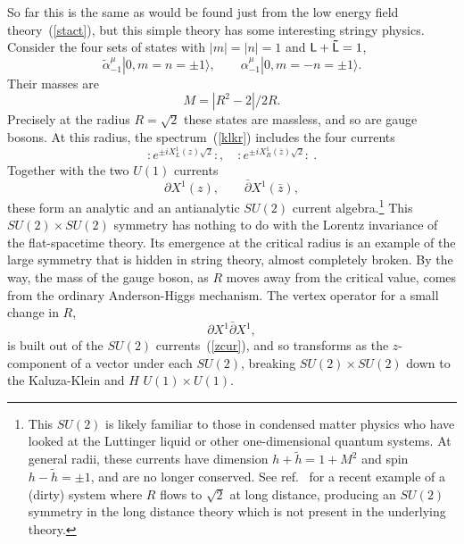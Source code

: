 So far this is the same as would be found just from the low energy
field theory~(\ref{stact}), but this simple theory has some
interesting stringy physics.  Consider the four sets of states with
$|m|= |n| = 1$ and ${\sf L} + {\sf \tilde L} = 1$,
\begin{equation}
\tilde\alpha_{-1}^\mu | 0, m=n= \pm 1 \rangle, \qquad
\alpha_{-1}^\mu | 0, m=-n= \pm 1 \rangle.
\end{equation}
Their masses are
\begin{equation}
M = |R^2 - 2|/2R.
\end{equation}
Precisely at the radius $R = \sqrt{2}$ these states are massless,
and so are gauge bosons.  At this radius, the spectrum~(\ref{klkr})
includes the four currents
\begin{equation}
:\! e^{\pm i X^{1}_L(z) \sqrt{2} }\! :, \quad
:\! e^{\pm i X^{1}_R(\bar z) \sqrt{2} }\! :\ .
\end{equation}
Together with the two $U(1)$ currents
\begin{equation}
\partial X^{1}(z), \qquad \bar\partial X^{1}(\bar z), \label{zcur}
\end{equation}
these form an analytic and an antianalytic $SU(2)$ current
algebra.\footnote
{This $SU(2)$ is likely familiar to those in condensed matter physics
who have looked at the Luttinger liquid or other one-dimensional
quantum systems.  At general radii, these currents have dimension
$h + \tilde h = 1 + M^2$ and spin $h - \tilde h = \pm 1$, and are
no longer conserved.  See ref.~\cite{KFP} for a recent example of a
(dirty) system where $R$ flows to $\sqrt 2$ at long distance,
producing an
$SU(2)$ symmetry in the long distance theory which is not present in
the underlying theory.}  This $SU(2) \times SU(2)$ symmetry has
nothing to do with the Lorentz invariance of the flat-spacetime
theory.  Its emergence at the critical radius is an example of the
large symmetry that is hidden in string theory, almost completely
broken.  By the way, the mass of the gauge boson, as $R$ moves away
from the critical value, comes from the ordinary Anderson-Higgs
mechanism.  The vertex operator for a small change in $R$,
\begin{equation}
\partial X^{1} \bar\partial X^{1}, \label{radmod}
\end{equation}
is built out of the $SU(2)$
currents~(\ref{zcur}), and so transforms as the $z$-component of a
vector under each $SU(2)$, breaking $SU(2) \times SU(2)$ down to
the Kaluza-Klein and $H$ $U(1) \times U(1)$.
 
